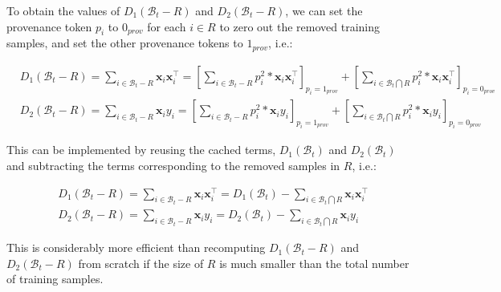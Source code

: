 \documentclass[11pt]{article}
\newcommand{\x}{\textbf{x}}
\newcommand{\y}{y}
\newcommand{\miniB}{\mathscr{B}}
\begin{document}
To obtain the values of $D_1(\miniB_t - R)$ and $D_2(\miniB_t - R)$, we can set the provenance token $p_i $ to $0_{{prov}}$ for each $i\in R$ to zero out the removed training samples, and set the other provenance tokens to $1_{{prov}}$, i.e.:
\begin{small}
\begin{align*}
    & D_1(\miniB_t - R) = \sum\nolimits_{i \in \miniB_t - R} \x_i\x_i^\top = [\sum\nolimits_{i \in \miniB_t - R} p_i^2*\x_i\x_i^\top]_{p_i = 1_{{prov}}} + [\sum\nolimits_{i \in \miniB_t \bigcap R} p_i^2*\x_i\x_i^\top]_{p_i = 0_{{prov}}}\\
    & D_2(\miniB_t - R) = \sum\nolimits_{i \in \miniB_t - R}\x_i \y_i = [\sum\nolimits_{i \in \miniB_t - R} p_i^2*\x_i\y_i]_{p_i = 1_{{prov}}} + [\sum\nolimits_{i \in \miniB_t \bigcap R} p_i^2*\x_i\y_i]_{p_i = 0_{{prov}}}
\end{align*}
\end{small}

This can be implemented by reusing the cached terms, $D_1(\miniB_t)$ and $D_2(\miniB_t)$ and subtracting the terms corresponding to the removed samples in $R$, i.e.:
\begin{small}
\begin{align*}
    & D_1(\miniB_t - R) = \sum\nolimits_{i \in \miniB_t - R} \x_i\x_i^\top 
    = D_1(\miniB_t) - \sum\nolimits_{i \in \miniB_t \bigcap R} \x_i\x_i^\top\\
    & D_2(\miniB_t - R) = \sum\nolimits_{i \in \miniB_t - R}\x_i \y_i = D_2(\miniB_t) - \sum\nolimits_{i \in \miniB_t \bigcap R} \x_i\y_i
\end{align*}
\end{small}
\noindent
This is considerably more efficient than recomputing $D_1(\miniB_t - R)$ and $D_2(\miniB_t - R)$ from scratch  if the size of $R$ is much smaller than the total number of training samples.







\end{document}
